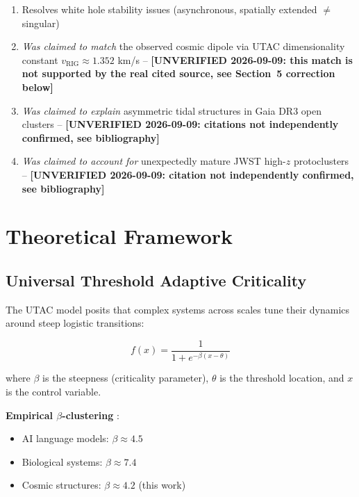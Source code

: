 \documentclass[11pt,a4paper,twocolumn]{article}
\begin{document}
\begin{enumerate}
    \item Resolves white hole stability issues (asynchronous, spatially extended $\neq$ singular)
    \item \textit{Was claimed to match} the observed cosmic dipole via UTAC dimensionality constant $v_{\text{RIG}} \approx 1.352$ km/s -- \textbf{[UNVERIFIED 2026-09-09: this match is not supported by the real cited source, see Section~5 correction below]}
    \item \textit{Was claimed to explain} asymmetric tidal structures in Gaia DR3 open clusters \citep{risbud2025,sharma2025} -- \textbf{[UNVERIFIED 2026-09-09: citations not independently confirmed, see bibliography]}
    \item \textit{Was claimed to account for} unexpectedly mature JWST high-$z$ protoclusters \citep{mayer2025} -- \textbf{[UNVERIFIED 2026-09-09: citation not independently confirmed, see bibliography]}
\end{enumerate}

\section{Theoretical Framework}

\subsection{Universal Threshold Adaptive Criticality}

The UTAC model \citep{romer2025utac} posits that complex systems across scales tune their dynamics around steep logistic transitions:

\begin{equation}
f(x) = \frac{1}{1 + e^{-\beta(x - \theta)}}
\end{equation}

where $\beta$ is the steepness (criticality parameter), $\theta$ is the threshold location, and $x$ is the control variable.

\textbf{Empirical $\beta$-clustering} \citep{romer2025beta}:
\begin{itemize}
    \item AI language models: $\beta \approx 4.5$
    \item Biological systems: $\beta \approx 7.4$
    \item Cosmic structures: $\beta \approx 4.2$ (this work)
\end{itemize}
\end{document}

